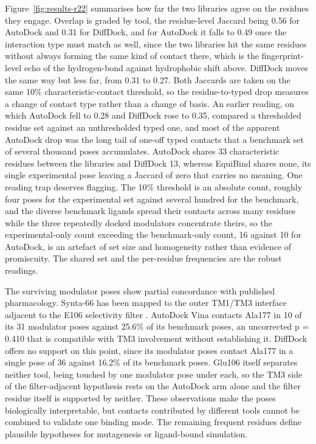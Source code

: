 Figure~\ref{fig:results-r22} summarises how far the two libraries agree on the residues they engage. Overlap is graded by tool, the residue-level Jaccard being 0.56 for AutoDock and 0.31 for DiffDock, and for AutoDock it falls to 0.49 once the interaction type must match as well, since the two libraries hit the same residues without always forming the same kind of contact there, which is the fingerprint-level echo of the hydrogen-bond against hydrophobic shift above. DiffDock moves the same way but less far, from 0.31 to 0.27. Both Jaccards are taken on the same 10\% characteristic-contact threshold, so the residue-to-typed drop measures a change of contact type rather than a change of basis. An earlier reading, on which AutoDock fell to 0.28 and DiffDock rose to 0.35, compared a thresholded residue set against an unthresholded typed one, and most of the apparent AutoDock drop was the long tail of one-off typed contacts that a benchmark set of several thousand poses accumulates. AutoDock shares 33 characteristic residues between the libraries and DiffDock 13, whereas EquiBind shares none, its single experimental pose leaving a Jaccard of zero that carries no meaning. One reading trap deserves flagging. The 10\% threshold is an absolute count, roughly four poses for the experimental set against several hundred for the benchmark, and the diverse benchmark ligands spread their contacts across many residues while the three repeatedly docked modulators concentrate theirs, so the experimental-only count exceeding the benchmark-only count, 16 against 10 for AutoDock, is an artefact of set size and homogeneity rather than evidence of promiscuity. The shared set and the per-residue frequencies are the robust readings.

The surviving modulator poses show partial concordance with published pharmacology. Synta-66 has been mapped to the outer TM1/TM3 interface adjacent to the E106 selectivity filter \cite{ref071}. AutoDock Vina contacts Ala177 in 10 of its 31 modulator poses against 25.6\% of its benchmark poses, an uncorrected p = 0.410 that is compatible with TM3 involvement without establishing it. DiffDock offers no support on this point, since its modulator poses contact Ala177 in a single pose of 36 against 16.2\% of its benchmark poses. Glu106 itself separates neither tool, being touched by one modulator pose under each, so the TM3 side of the filter-adjacent hypothesis rests on the AutoDock arm alone and the filter residue itself is supported by neither. These observations make the poses biologically interpretable, but contacts contributed by different tools cannot be combined to validate one binding mode. The remaining frequent residues define plausible hypotheses for mutagenesis or ligand-bound simulation.

